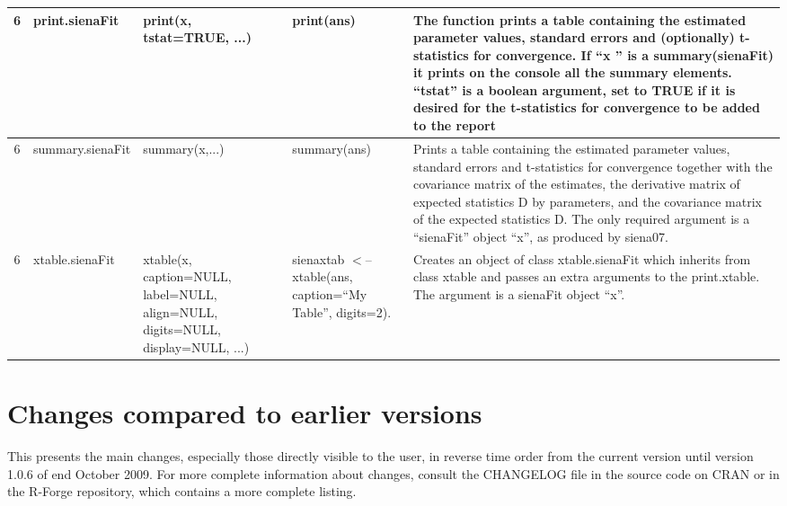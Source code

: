 \documentclass[a4paper,fleqn,11pt]{article}
\newcommand{\+}{\, + \,}
\begin{document}
\begin{landscape}
\begin{small}
\begin{longtable}{c | p{2.4cm} | p{4.5cm} | p{4.0cm} | p{9.0cm} }
6 & print.sienaFit & print(x, tstat=TRUE, ...) & print(ans) & The function
prints a table containing the estimated parameter values, standard errors and
(optionally) t-statistics for convergence. If ``x '' is a summary(sienaFit) it
prints on the console all the summary elements. ``tstat'' is a boolean
argument, set to TRUE if it is desired for the t-statistics for convergence to
be added to the report\\
\hline

6 & summary.sienaFit & summary(x,...) & summary(ans) & Prints a table
containing the estimated parameter values, standard errors and t-statistics for
convergence together with the covariance matrix of the estimates, the
derivative matrix of expected statistics D by parameters, and the covariance
matrix of the expected statistics D.  The only required argument is a
``sienaFit'' object ``x'', as produced by  siena07.\\
\hline

6 & xtable.sienaFit & xtable(x, caption=NULL, \newline
label=NULL, align=NULL, \newline
digits=NULL,\newline
 display=NULL, ...) & sienaxtab $<$-- \newline
 xtable(ans, \newline
caption=``My
Table'', \newline
digits=2).  &Creates an object of class xtable.sienaFit which inherits
from class xtable and passes an extra arguments to the print.xtable.
The argument is a sienaFit object ``x''. \\
\hline


\end{longtable}
\end{small}
\end{landscape}


%



\section{Changes compared to earlier versions}

This presents the main changes, especially those directly visible to the user,
in reverse time order from the current version until
version 1.0.6 of end October 2009.
For more complete information about changes,
consult the CHANGELOG file in the source code on CRAN or in
the R-Forge repository, which contains a more complete listing.
\end{document}
